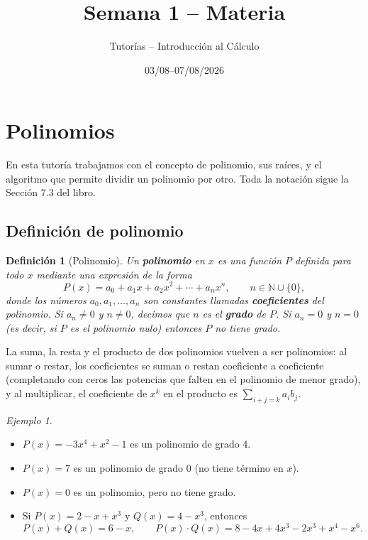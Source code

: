 \documentclass[11pt]{article}
\title{Semana 1 -- Materia}
\author{Tutorías -- Introducción al Cálculo}
\date{03/08--07/08/2026}
\newtheorem{definicion}{Definición}[section]
\theoremstyle{remark}
\newtheorem*{ejemplo}{Ejemplo}
\begin{document}
\maketitle

\section{Polinomios}

En esta tutoría trabajamos con el concepto de polinomio, sus raíces, y el
algoritmo que permite dividir un polinomio por otro. Toda la notación sigue
la Sección 7.3 del libro.

\subsection{Definición de polinomio}

\begin{definicion}[Polinomio]
Un \textbf{polinomio} en $x$ es una función $P$ definida para todo $x$ mediante
una expresión de la forma
$$P(x) = a_0 + a_1 x + a_2 x^2 + \cdots + a_n x^n, \qquad n \in \mathbb{N} \cup \{0\},$$
donde los números $a_0, a_1, \dots, a_n$ son constantes llamadas \textbf{coeficientes}
del polinomio. Si $a_n \neq 0$ y $n \neq 0$, decimos que $n$ es el \textbf{grado}
de $P$. Si $a_n = 0$ y $n=0$ (es decir, si $P$ es el polinomio nulo) entonces $P$
no tiene grado.
\end{definicion}

La suma, la resta y el producto de dos polinomios vuelven a ser polinomios: al
sumar o restar, los coeficientes se suman o restan coeficiente a coeficiente
(completando con ceros las potencias que falten en el polinomio de menor
grado), y al multiplicar, el coeficiente de $x^k$ en el producto es
$\sum_{i+j=k} a_i b_j$.

\begin{ejemplo}
\begin{itemize}
\item $P(x) = -3x^4 + x^2 - 1$ es un polinomio de grado 4.
\item $P(x) = 7$ es un polinomio de grado 0 (no tiene término en $x$).
\item $P(x) = 0$ es un polinomio, pero no tiene grado.
\item Si $P(x) = 2 - x + x^3$ y $Q(x) = 4 - x^3$, entonces
$$P(x) + Q(x) = 6 - x, \qquad P(x) \cdot Q(x) = 8 - 4x + 4x^3 - 2x^3 + x^4 - x^6.$$
\end{itemize}
\end{ejemplo}
\end{document}
